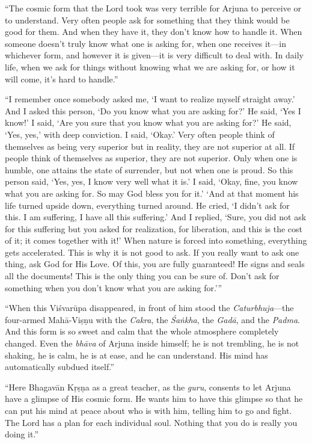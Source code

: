 \enquote{The cosmic form that the Lord took was very terrible for Arjuna to perceive or to understand. Very often people ask for something that they think would be good for them. And when they have it, they don’t know how to handle it. When someone doesn’t truly know what one is asking for, when one receives it---in whichever form, and however it is given---it is very difficult to deal with. In daily life, when we ask for things without knowing what we are asking for, or how it will come, it’s hard to handle.}

\enquote{I remember once somebody asked me, \enquote{I want to realize myself straight away.} And I asked this person, \enquote{Do you know what you are asking for?} He said, \enquote{Yes I know!} I said, \enquote{Are you sure that you know what you are asking for?} He said, \enquote{Yes, yes,} with deep conviction. I said, \enquote{Okay.} Very often people think of themselves as being very superior but in reality, they are not superior at all. If people think of themselves as superior, they are not superior. Only when one is humble, one attains the state of surrender, but not when one is proud. So this person said, \enquote{Yes, yes, I know very well what it is.} I said, \enquote{Okay, fine, you know what you are asking for. So may God bless you for it.} \enquote{And at that moment his life turned upside down, everything turned around. He cried, ‘I didn’t ask for this. I am suffering, I have all this suffering.’ And I replied, ‘Sure, you did not ask for this suffering but you asked for realization, for liberation, and this is the cost of it; it comes together with it!’ When nature is forced into something, everything gets accelerated. This is why it is not good to ask. If you really want to ask one thing, ask God for His Love. Of this, you are fully guaranteed! He signs and seals all the documents! This is the only thing you can be sure of. Don’t ask for something when you don’t know what you are asking for.}}

\enquote{When this Viśvarūpa disappeared, in front of him stood the \textit{Caturbhuja}---the four-armed Mahā-Viṣṇu with the \textit{Cakra}, the \textit{Śaṅkha}, the \textit{Gadā}, and the \textit{Padma}. And this form is so sweet and calm that the whole atmosphere completely changed. Even the \textit{bhāva} of Arjuna inside himself; he is not trembling, he is not shaking, he is calm, he is at ease, and he can understand. His mind has automatically subdued itself.}

\enquote{Here Bhagavān Kṛṣṇa as a great teacher, as the \textit{guru}, consents to let Arjuna have a glimpse of His cosmic form. He wants him to have this glimpse so that he can put his mind at peace about who is with him, telling him to go and fight. The Lord has a plan for each individual soul. Nothing that you do is really you doing it.}



